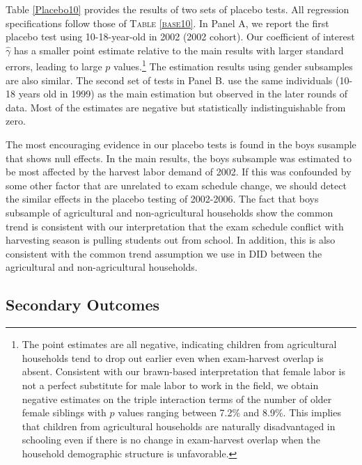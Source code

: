 \documentclass[12pt,letterpaper]{article}\usepackage[margin=1in]{geometry}
\newcommand{\0}{\ensuremath{\mbox{\boldmath $0$}}}
\begin{document}
Table \ref{Placebo10} provides the results of two sets of placebo tests. All regression specifications follow those of \textsc{Table \ref{base10}}. In Panel A, we report the first placebo test using 10-18-year-old in 2002 (2002 cohort). Our coefficient of interest $\hat{\gamma}$ has a smaller point estimate relative to the main results with larger standard errors, leading to large $p$ values.\footnote{The point estimates are all negative, indicating children from agricultural households tend to drop out earlier even when exam-harvest overlap is absent. Consistent with our brawn-based interpretation that female labor is not a perfect substitute for male labor to work in the field, we obtain negative estimates on the triple interaction terms of the number of older female siblings with $p$ values ranging between 7.2\% and 8.9\%. This implies that children from agricultural households are naturally disadvantaged in schooling even if there is no change in exam-harvest overlap when the household demographic structure is unfavorable. } The estimation results using gender subsamples are also similar. The second set of tests in Panel B. use the same individuals (10-18 years old in 1999) as the main estimation but observed in the later rounds of data. Most of the estimates are negative but statistically indistinguishable from zero. 

The most encouraging evidence in our placebo tests is found in the boys susample that shows null effects. In the main results, the boys subsample was estimated to be most affected by the harvest labor demand of 2002. If this was confounded by some other factor that are unrelated to exam schedule change, we should detect the similar effects in the placebo testing of 2002-2006. The fact that boys subsample of agricultural and non-agricultural households show the common trend is consistent with our interpretation that the exam schedule conflict with harvesting season is pulling students out from school. In addition, this is also consistent with the common trend assumption we use in DID between the agricultural and non-agricultural households. 



\subsection{Secondary Outcomes}
\end{document}
